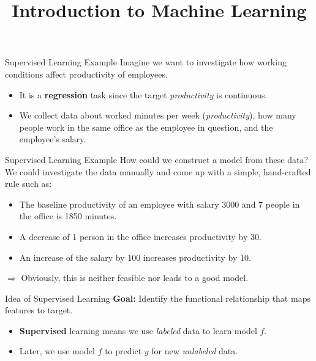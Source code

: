 \documentclass[11pt,compress,t,notes=noshow, xcolor=table]{beamer}
\title{Introduction to Machine Learning}
\begin{document}


\begin{frame}{Supervised Learning Example}
Imagine we want to investigate how working conditions affect productivity of employees.
\begin{itemize}
  \item It is a \textbf{regression} task since the target \emph{productivity} is continuous.
  \item We collect data about worked minutes per week (\emph{productivity}), how many people work in the same office as the employee in question, and the employee's salary.
\end{itemize}
\end{frame}


\begin{frame}{Supervised Learning Example}
How could we construct a model from these data?\\[1ex]
We could investigate the data manually and come up with a simple, hand-crafted rule such as:
\vfill
\begin{itemize}
\item The baseline productivity of an employee with salary 3000 and 7 people in the office is 1850 minutes.
\item A decrease of 1 person in the office increases productivity by 30.
\item An increase of the salary by 100 increases productivity by 10.
\end{itemize}
\vfill
$\Rightarrow$ Obviously, this is neither feasible nor leads to a good model.
\end{frame}


\begin{frame}{Idea of Supervised Learning}
\textbf{Goal:} Identify the functional relationship that maps features to target.
\lz
\begin{itemize}
  \item \textbf{Supervised} learning means we use \emph{labeled} data to learn model $f$.
  \item Later, we use model $f$ to predict $y$ for 
  new \emph{unlabeled} data.
\end{itemize}
\end{frame}
\end{document}
